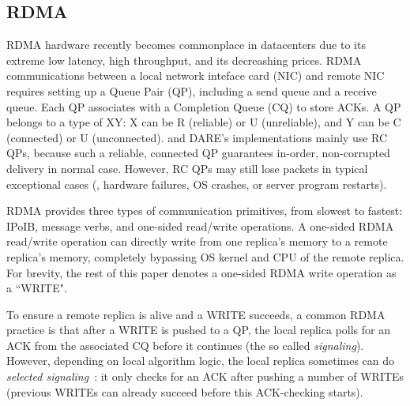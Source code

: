 \subsection{RDMA}\label{sec:rdma}
RDMA hardware recently becomes commonplace in datacenters due to its extreme 
low latency, high throughput, and its decreashing prices. RDMA communications 
between a local network inteface card (NIC) and remote NIC requires setting up a 
Queue Pair (QP), including a send queue and a receive queue. Each QP associates 
with a Completion Queue (CQ) to store ACKs. A QP belongs to a type of 
XY: X can be R (reliable) or U (unreliable), and Y can be C (connected) or U 
(unconnected). \xxx and DARE's implementations mainly use RC QPs, because such a 
reliable, connected QP guarantees in-order, non-corrupted delivery in normal 
case. However, RC QPs may still lose packets in typical \paxos exceptional cases 
(\eg, hardware failures, OS crashes, or server program restarts).

RDMA provides three types of communication primitives, from slowest to 
fastest: IPoIB, message verbs, and one-sided read/write operations. A one-sided 
RDMA read/write operation can directly write from one replica's memory to a 
remote replica's memory, completely bypassing OS kernel and CPU of the remote 
replica. For brevity, the rest of this paper denotes a one-sided RDMA write 
operation as a ``WRITE".

To ensure a remote replica is alive and a WRITE succeeds, a common RDMA 
practice is that after a WRITE is pushed to a QP, the local replica polls
for an ACK from the associated CQ before it continues (the so called 
\emph{signaling}). However, depending on local algorithm logic, the local 
replica sometimes can do \emph{selected signaling}~\cite{herd:sigcomm14}: it 
only checks for an ACK after pushing a number of WRITEs (previous WRITEs can 
already succeed before this ACK-checking starts).


